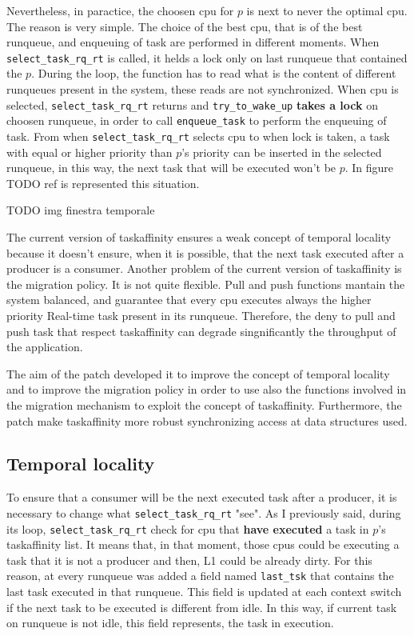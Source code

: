 Nevertheless, in paractice, the choosen cpu for $p$ is next to never the optimal cpu. The reason is very simple. The choice of the best 
cpu, that is of the best runqueue, and enqueuing of task are performed in different moments. When \texttt{select\_task\_rq\_rt} is called, it helds a lock 
only on last runqueue that contained the $p$. During the loop, the function has to read what is the content of different runqueues present in 
the system, these reads are not synchronized. When cpu is selected, \texttt{select\_task\_rq\_rt} returns and \texttt{try\_to\_wake\_up} \textbf{takes 
a lock} on choosen runqueue, in order to call \texttt{enqueue\_task} to perform the enqueuing of task. From when \texttt{select\_task\_rq\_rt} selects cpu 
to when lock is taken, a task with equal or higher priority than $p$'s priority can be inserted in the selected runqueue, in this way, the next task that 
will be executed won't be $p$. In figure TODO ref is represented this situation.

TODO img finestra temporale

The current version of taskaffinity ensures a weak concept of temporal locality because it doesn't ensure, when it is possible, that the next task executed 
after a producer is a consumer. Another problem of the current version of taskaffinity is the migration policy. It is not quite flexible. Pull and push 
functions mantain the system balanced, and guarantee that every cpu executes always the higher priority Real-time task present in its runqueue.
Therefore, the deny to pull and push task that respect taskaffinity can degrade singnificantly the throughput of the application.

The aim of the patch developed it to improve the concept of temporal locality and to improve the migration policy in order to use also the functions 
involved in the migration mechanism to exploit the concept of taskaffinity. Furthermore, the patch make taskaffinity more robust synchronizing access at 
data structures used.

\subsection{Temporal locality}

To ensure that a consumer will be the next executed task after a producer, it is necessary to change what \texttt{select\_task\_rq\_rt} "see". As I 
previously said, during its loop, \texttt{select\_task\_rq\_rt} check for cpu that \textbf{have executed} a task in $p$'s taskaffinity list. It means
that, in that moment, those cpus could be executing a task that it is not a producer and then, L1 could be already dirty. For this reason, at every 
runqueue was added a field named \texttt{last\_tsk} that contains the last task executed in that runqueue. This field is updated at each context switch 
if the next task to be executed is different from idle. In this way, if current task on runqueue is not idle, this field represents, the task in execution. 


